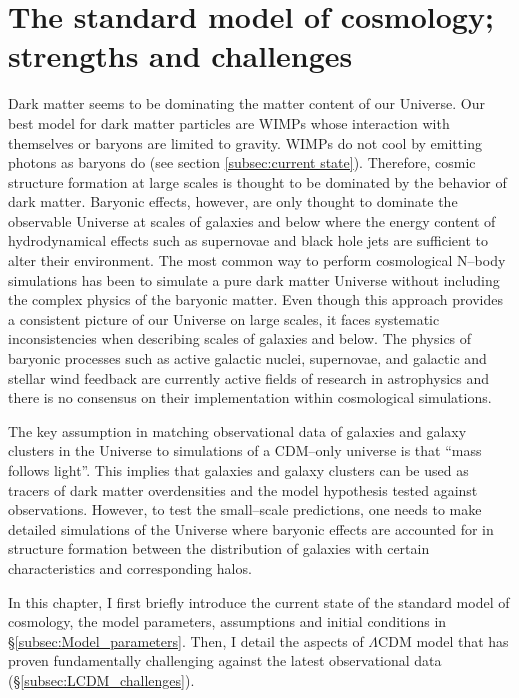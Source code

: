 \documentclass[a4wide,12pt]{book}
\begin{document}
{\chapter{The standard model of cosmology; strengths and challenges}
\label{sec:LCDM}
Dark matter seems to be dominating the matter content of our Universe. Our best model for dark matter particles are WIMPs whose interaction with themselves or baryons are limited to gravity.  WIMPs do not cool by emitting photons as baryons do (see section \ref{subsec:current state}). Therefore, cosmic structure formation at large scales is thought to be dominated by the behavior of dark matter. Baryonic effects, however, are only thought to dominate the observable Universe at scales of galaxies and below where the energy content of hydrodynamical effects such as supernovae and black hole jets are sufficient to alter their environment. The most common way to perform cosmological N--body simulations has been to simulate a pure dark matter Universe without including the complex physics of the baryonic matter.  Even though this approach provides a consistent picture of our Universe on large scales, it faces systematic inconsistencies when describing scales of galaxies and below. The physics of baryonic processes such as active galactic nuclei, supernovae, and galactic and stellar wind feedback are currently active fields of research in astrophysics and there is no consensus on their implementation within cosmological simulations. 

The key assumption in matching observational data of galaxies and galaxy clusters in the Universe to simulations of a CDM--only universe is that ``mass follows light''. This implies that galaxies and galaxy clusters can be used as tracers of dark matter overdensities and the model hypothesis tested against observations. However, to test the small--scale predictions, one needs to make detailed simulations of the Universe where baryonic effects are accounted for in structure formation  between the distribution of galaxies with certain characteristics and corresponding halos.

In this chapter, I first briefly introduce the current state of the standard model of cosmology, the model parameters, assumptions and initial conditions in  \S \ref{subsec:Model_parameters}. Then, I detail the aspects of $\Lambda$CDM model that has proven fundamentally challenging against the latest observational data (\S \ref{subsec:LCDM_challenges}).

}
\end{document}

